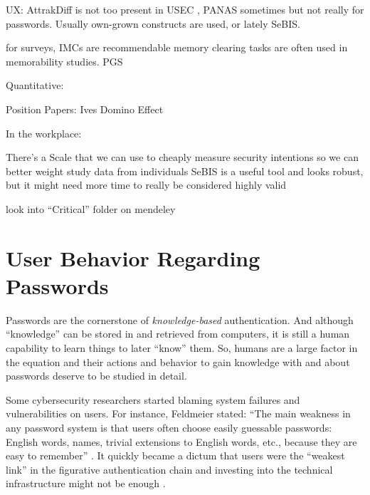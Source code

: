 UX: AttrakDiff is not too present in USEC \cite{Hassenzahl2003AttrakDiffGerman}, PANAS sometimes \cite{Rosoff2014BehavioralExperimentsFraud} but not really for passwords. Usually own-grown constructs are used, or lately SeBIS.

for surveys, IMCs are recommendable \cite{Oppenheimer2009InstructionalManipulationChecks}
memory clearing tasks are often used in memorability studies.
PGS 


Quantitative: 


Position Papers:
Ives Domino Effect \cite{Ives2004DominoEffectReuse}

In the workplace: \cite{Adams1997MakingPWsSecureAndUsable, Inglesant2010TrueCostOfUnusablePolicies}



			
	
	There's a Scale that we can use to cheaply measure security intentions so we can better weight study data from individuals \cite{Egelman2015SeBIS}
	SeBIS is a useful tool and looks robust, but it might need more time to really be considered highly valid \cite{Egelman2016BehaviorEverFollows}

	look into ``Critical'' folder on mendeley

	
\section{User Behavior Regarding Passwords}\label{sec:rw:user-behavior}
Passwords are the cornerstone of \textit{knowledge-based} authentication. And although ``knowledge'' can be stored in and retrieved from computers, it is still a human capability to learn things to later ``know'' them. So, humans are a large factor in the equation and their actions and behavior to gain knowledge with and about passwords deserve to be studied in detail. 

Some cybersecurity researchers started blaming system failures and vulnerabilities on users. For instance, Feldmeier \etal stated: ``The main weakness in any password system is that users often choose easily guessable passwords: English words, names, trivial extensions to English words, etc., because they are easy to remember'' \cite{Feldmeier1990UnixPasswordSecurity}. It quickly became a dictum that users were the ``weakest link'' in the figurative authentication chain and investing into the technical infrastructure might not be enough \cite{Sasse2001WeakestLink}. 


